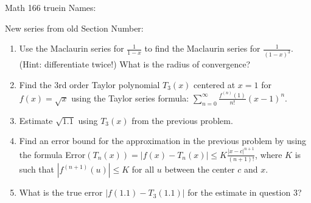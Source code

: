 \documentclass[12pt]{article}
\begin{document}
\pagestyle{empty} %

\noindent
{Math 166  truein  Names:\ \hrulefill}

\noindent
{New series from old}
\noindent \hspace{2.5in} Section Number: \hrulefill
\bigskip


\begin{enumerate}


\item Use the Maclaurin series for $\displaystyle\frac{1}{1-x}$ to find the Maclaurin series for $\displaystyle\frac{1}{(1-x)^3}$. (Hint: differentiate twice!) What is the radius of convergence? 

\vfill

\vfill

\item Find the 3rd order Taylor polynomial $T_3(x)$ centered at $x = 1$ for $f(x)=\sqrt{x}$ using the Taylor series formula: $\displaystyle\sum_{n=0}^{\infty} \displaystyle\frac{f^{(n)}(1)}{n!} (x-1)^n$.
\vfill

\vfill
\item Estimate $\sqrt{1.1}$ using $T_3(x)$ from the previous problem.

\vspace{1in}
\newpage

\item Find an error bound for the approximation in the previous problem by using the formula Error$(T_n (x))=|f(x)-T_n(x)|\leq K \frac{|x-c|^{n+1}}{(n+1)!}$, where $K$ is such that $|f^{(n+1)}(u)|\leq K$ for all $u$ between the center $c$ and $x$.
\vfill
\vfill
\item What is the true error $|f(1.1)-T_3(1.1)|$ for the estimate in question 3?
\vfill





\end{enumerate}
\end{document}
